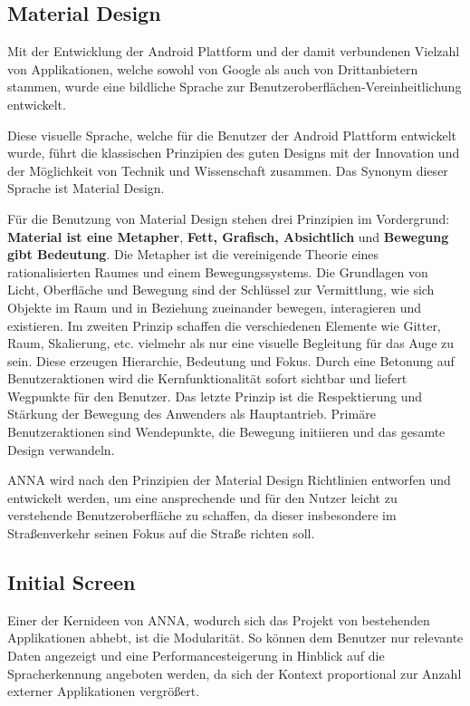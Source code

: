 \subsection{Material Design}
Mit der Entwicklung der Android Plattform und der damit verbundenen Vielzahl von Applikationen, welche sowohl von Google als auch von Drittanbietern stammen, wurde eine bildliche Sprache zur Benutzeroberflächen-Vereinheitlichung entwickelt.

Diese visuelle Sprache, welche für die Benutzer der Android Plattform entwickelt wurde, führt die klassischen Prinzipien des guten Designs mit der Innovation und der Möglichkeit von Technik und Wissenschaft zusammen.
Das Synonym dieser Sprache ist Material Design.

Für die Benutzung von Material Design stehen drei Prinzipien im Vordergrund: \textbf{Material ist eine Metapher}, \textbf{Fett, Grafisch, Absichtlich} und \textbf{Bewegung gibt Bedeutung}. Die Metapher ist die vereinigende Theorie eines rationalisierten Raumes und einem Bewegungssystems. Die Grundlagen von Licht, Oberfläche und Bewegung sind der Schlüssel zur Vermittlung, wie sich Objekte im Raum und in Beziehung zueinander bewegen, interagieren und existieren. Im zweiten Prinzip schaffen die verschiedenen Elemente wie Gitter, Raum, Skalierung, etc. vielmehr als nur eine visuelle Begleitung für das Auge zu sein. Diese erzeugen Hierarchie, Bedeutung und Fokus. Durch eine Betonung auf Benutzeraktionen wird die Kernfunktionalität sofort sichtbar und liefert Wegpunkte für den Benutzer. Das letzte Prinzip ist die Respektierung und Stärkung der Bewegung des Anwenders als Hauptantrieb. Primäre Benutzeraktionen sind Wendepunkte, die Bewegung initiieren und das gesamte Design verwandeln.


\ac{ANNA} wird nach den Prinzipien der Material Design Richtlinien entworfen und entwickelt werden, um eine ansprechende und für den Nutzer leicht zu verstehende Benutzeroberfläche zu schaffen, da dieser insbesondere im Straßenverkehr seinen Fokus auf die Straße richten soll. 

\subsection{Initial Screen}
\label{initScreen}
Einer der Kernideen von \ac{ANNA}, wodurch sich das Projekt von bestehenden Applikationen abhebt, ist die Modularität. So können dem Benutzer nur relevante Daten angezeigt und eine Performancesteigerung in Hinblick auf die Spracherkennung angeboten werden, da sich der Kontext proportional zur Anzahl externer Applikationen vergrößert.

